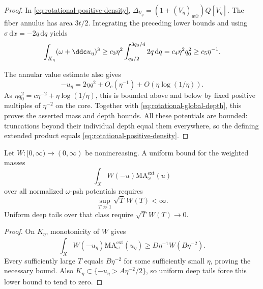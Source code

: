 \begin{proof}
In \eqref{eq:rotational-positive-density}, $\Delta_{V_\eta}=(1+(V_\eta)_{w\bar w})Q[V_\eta]$. The fiber annulus has area $3t/2$.
Integrating the preceding lower bounds and using
$\sigma\,\mathrm dx=-2q\,\mathrm dq$ yields
\[
 \int_{K_\eta}(\omega+\ddc u_\eta)^3
 \geq c_3\eta^2\int_{q_0/2}^{3q_0/4}2q\,\mathrm dq
 =c_4\eta^2q_0^2\geq c_5\eta^{-1}.
\]

The annular value estimate also gives
\[
 -u_\eta=2\eta q^2+O_c(\eta^{-1})+O(\eta\log(1/\eta)).
\]
As $\eta q_0^2=c\eta^{-2}+\eta\log(1/\eta)$, this is bounded above and below
by fixed positive multiples of $\eta^{-2}$ on the core.
Together with \eqref{eq:rotational-global-depth}, this proves the asserted mass and depth bounds.
All these potentials are bounded: truncations beyond their individual depth
equal them everywhere, so the defining extended product equals
\eqref{eq:rotational-positive-density}.

\end{proof}

\begin{corollary}\label{cor:rotational-necessary-weights}
Let $W:[0,\infty)\to(0,\infty)$ be nonincreasing. A uniform bound for the
weighted masses
\[
 \int_X W(-u)\mathrm{MA}^{\mathrm{ext}}_\omega(u)
\]
over all normalized $\omega$-psh potentials requires
\[
 \sup_{T\gg1}\sqrt T\,W(T)<\infty.
\]
Uniform deep tails over that class require $\sqrt T\,W(T)\to0$.
\end{corollary}
\begin{proof}
On $K_\eta$, monotonicity of $W$ gives
\[
 \int_XW(-u_\eta)\mathrm{MA}^{\mathrm{ext}}_\omega(u_\eta)
       \geq D\eta^{-1}W(B\eta^{-2}).
\]
Every sufficiently large $T$ equals $B\eta^{-2}$ for some sufficiently small
$\eta$, proving the necessary bound.
Also $K_\eta\subset\{-u_\eta>A\eta^{-2}/2\}$, so uniform deep tails force
this lower bound to tend to zero.
\end{proof}

